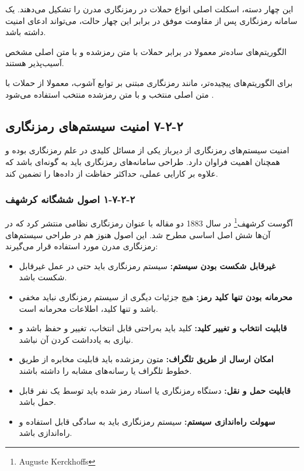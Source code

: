 این چهار دسته، اسکلت اصلی انواع حملات در رمزنگاری مدرن را تشکیل می‌دهند. یک سامانه رمزنگاری پس از مقاومت موفق در برابر این چهار حالت، می‌تواند ادعای امنیت داشته باشد.

الگوریتم‌های ساده‌تر معمولا در برابر حملات با متن رمزشده و با متن اصلی مشخص آسیب‌پذیر هستند.

برای الگوریتم‌های پیچیده‌تر، مانند رمزنگاری مبتنی بر توابع آشوب، معمولا از حملات با متن اصلی منتخب و با متن رمزشده منتخب استفاده می‌شود \cite{ref35}.

\subsection{‏۲‏-‏۲‏-‏۷‏ امنیت سیستم‌های رمزنگاری}

امنیت سیستم‌های رمزنگاری از دیرباز یکی از مسائل کلیدی در علم رمزنگاری بوده و همچنان اهمیت فراوان دارد. طراحی سامانه‌های رمزنگاری باید به گونه‌ای باشد که علاوه بر کارایی عملی، حداکثر حفاظت از داده‌ها را تضمین کند.

\subsubsection{‏۲‏-‏۲‏-‏۷‏-‏۱‏ اصول ششگانه کرشهف}

آگوست کرشهف\footnote{Auguste Kerckhoffs} در سال 1883 دو مقاله با عنوان رمزنگاری نظامی منتشر کرد که در آن‌ها شش اصل اساسی مطرح شد. این اصول هنوز هم در طراحی سیستم‌های رمزنگاری مدرن مورد استفاده قرار می‌گیرند:

\begin{itemize}
    \item \textbf{غیرقابل شکست بودن سیستم:} سیستم رمزنگاری باید حتی در عمل غیرقابل شکست باشد.
    \item \textbf{محرمانه بودن تنها کلید رمز:} هیچ جزئیات دیگری از سیستم رمزنگاری نباید مخفی باشد و تنها کلید، اطلاعات محرمانه است.
    \item \textbf{قابلیت انتخاب و تغییر کلید:} کلید باید به‌راحتی قابل انتخاب، تغییر و حفظ باشد و نیازی به یادداشت کردن آن نباشد.
    \item \textbf{امکان ارسال از طریق تلگراف:} متون رمزشده باید قابلیت مخابره از طریق خطوط تلگراف یا رسانه‌های مشابه را داشته باشند.
    \item \textbf{قابلیت حمل و نقل:} دستگاه رمزنگاری یا اسناد رمز شده باید توسط یک نفر قابل حمل باشد.
    \item \textbf{سهولت راه‌اندازی سیستم:} سیستم رمزنگاری باید به سادگی قابل استفاده و راه‌اندازی باشد.
\end{itemize}

